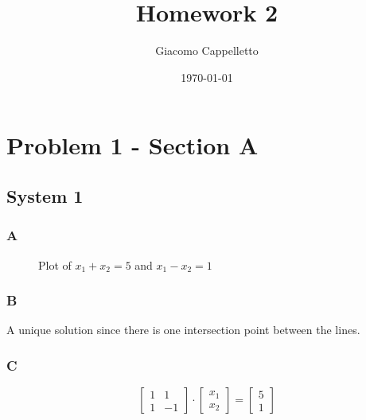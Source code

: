 \documentclass{article}
\title{Homework 2}
\author{Giacomo Cappelletto}
\date{\today}
\begin{document}
\maketitle

\section*{Problem 1 - Section A}

\subsection*{System 1}

\subsubsection*{A}
\begin{figure}[h!]
	\centering
	\caption{Plot of $x_1 + x_2 = 5$ and $x_1 - x_2 = 1$}
	\label{fig:plot1}
\end{figure}

\subsubsection*{B}

A unique solution since there is one intersection point between the lines.

\subsubsection*{C}

\[
	\begin{bmatrix}
		1 & 1  \\
		1 & -1
	\end{bmatrix}
	\cdot
	\begin{bmatrix}
		x_1 \\
		x_2
	\end{bmatrix}
	=
	\begin{bmatrix}
		5 \\
		1
	\end{bmatrix}
\]
\end{document}
